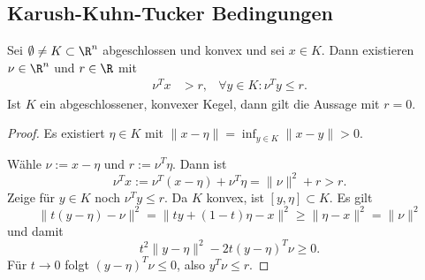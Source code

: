 \subsection{Karush-Kuhn-Tucker Bedingungen}


\begin{lem} \label{3.23}
	Sei $\emptyset \neq K \subset \R^n$ abgeschlossen und konvex und sei $x \in K$.
	Dann existieren $\nu \in \R^n$ und $r \in \R$ mit
	\begin{align*}
		\nu^T x &> r, &
		\forall y \in K : \nu^T y \le r.
	\end{align*}
	Ist $K$ ein abgeschlossener, konvexer Kegel, dann gilt die Aussage mit $r = 0$.
	\begin{proof}
		Es existiert $\eta \in K$ mit $\|x - \eta\| = \inf_{y\in K} \|x-y\| > 0$.

		Wähle $\nu := x - \eta$ und $r := \nu^T \eta$.
		Dann ist
		\[
			\nu^T x := \nu^T (x- \eta) + \nu^T \eta = \|\nu\|^2 + r > r.
		\]
		Zeige für $y \in K$ noch $\nu^T y \le r$.
		Da $K$ konvex, ist $[y, \eta] \subset K$.
		Es gilt
		\[
			\|t(y - \eta) - \nu\|^2
			 = \|ty + (1-t)\eta - x \|^2
			 \ge \|\eta - x\|^2
			= \|\nu\|^2
		\]
		und damit
		\[
			t^2 \|y-\eta\|^2 - 2t(y-\eta)^T \nu \ge 0.
		\]
		Für $t \to 0$ folgt $(y-\eta)^T \nu \le 0$, also $y^T \nu \le r$.
	\end{proof}
\end{lem}



